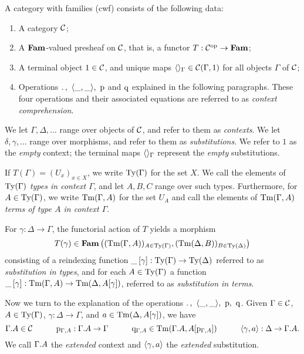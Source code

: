 \documentclass{lmcs}
\begin{document}
\begin{definition}\label{def:Cwfobj} 
A category with families (cwf) consists of the following data:

\begin{enumerate} 

\item A category ${\mathcal C}$; 

\item A $\textbf{Fam}$-valued presheaf on ${\mathcal C}$, that is, a functor
$T : {\mathcal C}^{\text{op}} \to \textbf{Fam}$;

\item A terminal object $1\in {\mathcal C}$, and unique maps
$\langle  \rangle_\Gamma \in {\mathcal C}(\Gamma, 1)$ for all objects $\Gamma$ of ${\mathcal C}$;

\item Operations ${.\,},~\langle \_,\_ \rangle,~\mathrm{p}$ and $\mathrm{q}$ 
explained in the following paragraphs.
These four operations and their associated equations
are referred to as \emph{context comprehension}.
\end{enumerate}

We let $\Gamma, \Delta,\ldots$ range over objects of ${\mathcal C}$, 
and refer to them as \emph{contexts}. 
We let $\delta, \gamma,\ldots$ range over morphisms, 
and refer to them as \emph{substitutions}. 
We refer to $1$ as the \emph{empty} context; the terminal maps
$\langle  \rangle_\Gamma$ represent the \emph{empty} substitutions.

If $T(\Gamma) = (U_x)_{x\in X}$, we write $\mathrm{Ty}(\Gamma)$ for the set $X$.
We call the elements of $\mathrm{Ty}(\Gamma)$ \emph{types in context $\Gamma$}, 
and let $A, B, C$ range over such types. 
Furthermore, for $A \in \mathrm{Ty}(\Gamma)$, we write $\mathrm{Tm}(\Gamma, A)$ for the set $U_A$
and call the elements of $\mathrm{Tm}(\Gamma, A)$ 
\emph{terms of type $A$ in context $\Gamma$}. 

For $\gamma : \Delta \to \Gamma$,
the functorial action of $T$ yields a morphism
\[
T(\gamma) \in  \Fam\left((\Tm(\Gamma, A))_{A\in \Ty(\Gamma)}, %
                (\Tm(\Delta, B))_{B\in \Ty(\Delta)}\right)
\]
consisting of a reindexing function $\_\,[\gamma] : \mathrm{Ty}(\Gamma) \to
\mathrm{Ty}(\Delta)$ referred to as \emph{substitution in types}, and for each $A\in
\mathrm{Ty}(\Gamma)$ a function $\_\,[\gamma] : \mathrm{Tm}(\Gamma, A) \to \mathrm{Tm}(\Delta,
A[\gamma])$, referred to as \emph{substitution in terms}.

Now we turn to the explanation of the operations 
${.\,},~\langle \_,\_ \rangle,~\mathrm{p},~\mathrm{q}$.
Given $\Gamma \in {\mathcal C}$, $A \in \mathrm{Ty}(\Gamma)$, $\gamma : \Delta \to \Gamma$,
and $a\in \mathrm{Tm}(\Delta, A[\gamma])$, we have
\[
\Gamma . A \in {\mathcal C}
\quad\qquad
\mathrm{p}_{\Gamma, A} : \Gamma . A \to \Gamma
\quad\qquad
\mathrm{q}_{\Gamma, A} \in \mathrm{Tm}(\Gamma. A, A[\mathrm{p}_{\Gamma,A}])
\quad\qquad
\langle \gamma, a \rangle : \Delta \to \Gamma . A.
\] 
We call $\Gamma . A$ the \emph{extended} context 
and $\langle \gamma, a \rangle$ the \emph{extended} substitution.


\end{definition}
\end{document}
